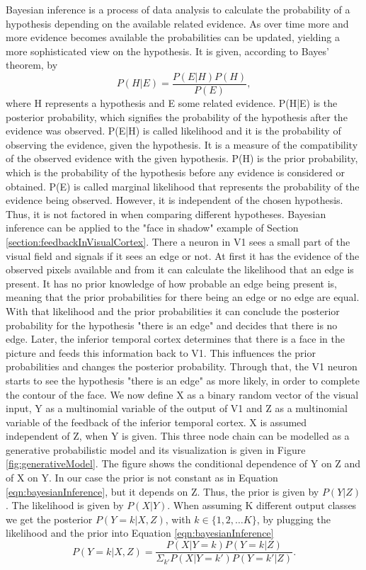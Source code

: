 Bayesian inference is a process of data analysis to calculate the probability of a hypothesis depending on the available related evidence. As over time more and more evidence becomes available the probabilities can be updated, yielding a more sophisticated view on the hypothesis. It is given, according to Bayes' theorem, by
\begin{equation}
\label{eqn:bayesianInference}
P(H|E) = \frac{P(E|H)P(H)}{P(E)},
\end{equation}
where H represents a hypothesis and E some related evidence. P(H|E) is the posterior probability, which signifies the probability of the hypothesis after the evidence was observed. P(E|H) is called likelihood and it is the probability of observing the evidence, given the hypothesis. It is a measure of the compatibility of the observed evidence with the given hypothesis. P(H) is the prior probability, which is the probability of the hypothesis before any evidence is considered or obtained. P(E) is called marginal likelihood that represents the probability of the evidence being observed. However, it is independent of the chosen hypothesis. Thus, it is not factored in when comparing different hypotheses.
Bayesian inference can be applied to the "face in shadow" example of Section \ref{section:feedbackInVisualCortex}. There a neuron in V1 sees a small part of the visual field and signals if it sees an edge or not. At first it has the evidence of the observed pixels available and from it can calculate the likelihood that an edge is present. It has no prior knowledge of how probable an edge being present is, meaning that the prior probabilities for there being an edge or no edge are equal. With that likelihood and the prior probabilities it can conclude the posterior probability for the hypothesis "there is an edge" and decides that there is no edge.
Later, the inferior temporal cortex determines that there is a face in the picture and feeds this information back to V1. This influences the prior probabilities and changes the posterior probability. Through that, the V1 neuron starts to see the hypothesis  "there is an edge" as more likely, in order to complete the contour of the face. 
We now define X as a binary random vector of the visual input, Y as a multinomial variable of the output of V1 and Z as a multinomial variable of the feedback of the inferior temporal cortex. X is assumed independent of Z, when Y is given. This three node chain can be modelled as a generative probabilistic model and its visualization is given in Figure \ref{fig:generativeModel}. The figure shows the conditional dependence of Y on Z and of X on Y. In our case the prior is not constant as in Equation \ref{eqn:bayesianInference}, but it depends on Z. Thus, the prior is given by $P(Y|Z)$. The likelihood is given by $P(X|Y)$. When assuming K different output classes we get the posterior $P(Y=k|X,Z)$, with $k \in \{1, 2, \dots K\}$, by plugging the likelihood and the prior into Equation \ref{eqn:bayesianInference}
\begin{equation}
\label{eqn:pYvorausgesetztXUndZ}
P(Y = k|X, Z) = \frac{P(X|Y=k)P(Y = k|Z)}{\Sigma_{k'}P(X|Y=k')P(Y=k'|Z)}.
\end{equation}

